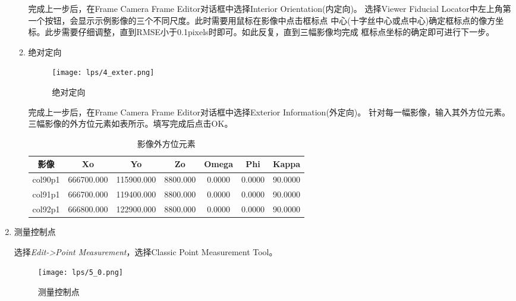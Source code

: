 \begin{enumerate}
\begin{enumerate}
            \hspace{20pt}完成上一步后，在Frame Camera Frame Editor对话框中选择Interior Orientation(内定向)。
            选择Viewer Fiducial Locator中左上角第一个按钮，会显示示例影像的三个不同尺度。此时需要用鼠标在影像中点击框标点
            中心(十字丝中心或点中心)确定框标点的像方坐标。此步需要仔细调整，直到RMSE小于0.1pixels时即可。如此反复，直到三幅影像均完成
            框标点坐标的确定即可进行下一步。

            \item 绝对定向
            
            \begin{figure}[H] 
                \centering 
                \texttt{[image: lps/4\_exter.png]}
                \caption{绝对定向}
            \end{figure}

            \hspace{20pt}完成上一步后，在Frame Camera Frame Editor对话框中选择Exterior Information(外定向)。
            针对每一幅影像，输入其外方位元素。三幅影像的外方位元素如表所示。填写完成后点击OK。

            \begin{table}[H]
                \centering

                \begin{tabular}{ccccccc}
                    \toprule
                      影像  & Xo & Yo & Zo & Omega & Phi & Kappa \\
                    \midrule
                        col90p1  &  666700.000 & 115900.000 & 8800.000 & 0.0000 & 0.0000 & 90.0000 \\
                        col91p1  & 666700.000 & 119400.000 & 8800.000 & 0.0000 & 0.0000 & 90.0000  \\
                        col92p1  & 666800.000 & 122900.000 & 8800.000 & 0.0000 & 0.0000 & 90.0000  \\
                    \bottomrule
                \end{tabular}
                \caption{影像外方位元素}
                \label{lps_expos}
            \end{table}

        \end{enumerate}

        \item 测量控制点
        
        \hspace{20pt}选择\textit{Edit->Point Measurement}，选择Classic Point Measurement Tool。
        \begin{figure}[H] 
            \centering 
            \texttt{[image: lps/5\_0.png]}
            \caption{测量控制点}
        \end{figure}


\end{enumerate}
